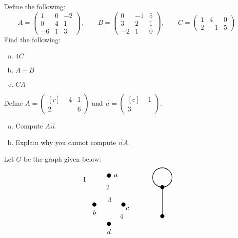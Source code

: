 \documentclass[12pt,letterpaper]{exam}
\begin{document}
\begin{questions}
\newpage
\question[10] Define the following:
	\[
	A= 
	\begin{pmatrix}
	1 & 0 & -2 \\
	0 & 4 & 1 \\
	-6 & 1 & 3
	\end{pmatrix},
	\qquad
	B= 
	\begin{pmatrix}
	0 & -1 & 5 \\
	3 & 2 & 1 \\
	-2 & 1 & 0 
	\end{pmatrix},
	\qquad
	C= 
	\begin{pmatrix}
	1 & 4 & 0 \\
	2 & -1 & 5 
	\end{pmatrix}
	\]
Find the following:
	\begin{enumerate}[(a)]
	\item $4C$
	\item $A - B$
	\item $CA$
	\end{enumerate}



\newpage
\question[10] Define $A= \begin{pmatrix*}[r] -4 & 1 \\ 2 & 6 \end{pmatrix*}$ and $\vec{u}= \begin{pmatrix*}[c] -1 \\ 3 \end{pmatrix*}$. 
	\begin{enumerate}[(a)]
	\item Compute $A \vec{u}$.
	\item Explain why you cannot compute $\vec{u} A$. 
	\end{enumerate}



\newpage
\question[10] Let $G$ be the graph given below:
	\[
	\begin{tikzpicture}
	\draw[fill=black] (0.75,1.5) circle (0.1); %
	\draw[fill=black] (0,0) circle (0.1); %
	\draw[fill=black] (1.5,0) circle (0.1); %
	\draw[fill=black] (0.75,-1) circle (0.1); %
	
	\node at (1.1,1.5) {$a$};
	\node at (0,-0.4) {$b$};
	\node at (1.7,-0.2) {$c$};
	\node at (0.75,-1.4) {$d$};
	
	\node at (-0.5,1.3) {$1$};
	\node at (0.7,0.9) {$2$};
	\node at (0.8,0.25) {$3$};
	\node at (1.4,-0.6) {$4$};	
	
	\draw[line width=0.03cm] (3.5,-0.6) -- (3.5,0.9); %
	\draw[line width=0.03cm] (3.5,1.4) circle (0.5); %
	\draw[fill=black] (3.5,0.9) circle (0.1); %
	\draw[fill=black] (3.5,-0.6) circle (0.1); %
	

\end{tikzpicture}\]
\end{questions}
\end{document}
